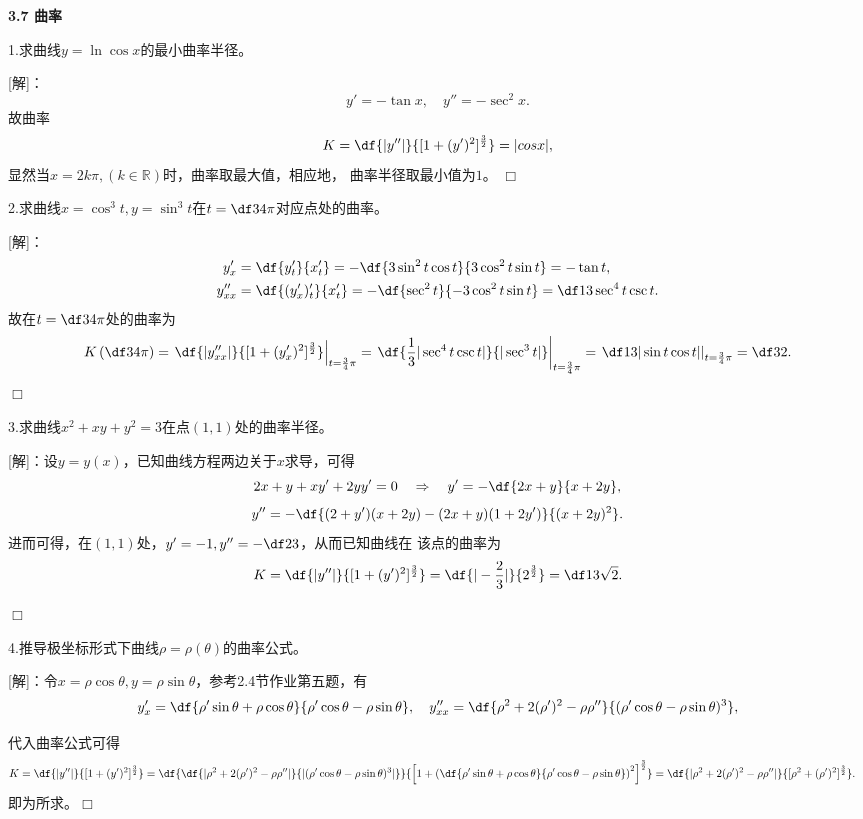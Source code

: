 \begin{center}
	\bf 3.7 曲率
\end{center}

1.求曲线$y=\ln\cos x$的最小曲率半径。

[解]：
$$y'=-\tan x,\quad y''=-\sec^2x.$$
故曲率
$$K=\df{|y''|}{[1+(y')^2]^{\frac32}}=|cos x|,$$
显然当$x=2k\pi,(k\in\mathbb{R})$时，曲率取最大值，相应地，
曲率半径取最小值为$1$。
\hfill$\Box$

\bigskip

2.求曲线$x=\cos^3t,y=\sin^3t$在$t=\df34\pi$对应点处的曲率。

[解]：
\begin{align*}
	y'_x&=\df{y'_t}{x'_t}=-\df{3\sin^2t\cos t}{3\cos^2t\sin t}
	=-\tan t,\\
	y''_{xx}&=\df{(y'_x)'_t}{x'_t}
	=-\df{\sec^2t}{-3\cos^2t\sin t}=\df13\sec^4t\csc t.
\end{align*}
故在$t=\df34\pi$处的曲率为
$$K\left(\df34\pi\right)=\left.\df{|y''_{xx}|}{[1+(y'_x)^2]^{\frac32}}\right|_{t=\frac34\pi}
=\left.\df{\frac13|\sec^4t\csc t|}{|\sec^3t|}\right|_{t=\frac34\pi}
=\left.\df1{3|\sin t\cos t|}\right|_{t=\frac34\pi}
=\df32.$$
\hfill$\Box$

\bigskip

3.求曲线$x^2+xy+y^2=3$在点$(1,1)$处的曲率半径。

[解]：设$y=y(x)$，已知曲线方程两边关于$x$求导，可得
$$2x+y+xy'+2yy'=0
\quad\Rightarrow\quad
y'=-\df{2x+y}{x+2y},$$
$$y''=-\df{(2+y')(x+2y)-(2x+y)(1+2y')}{(x+2y)^2}.$$
进而可得，在$(1,1)$处，$y'=-1,y''=-\df23$，从而已知曲线在
该点的曲率为
$$K=\df{|y''|}{[1+(y')^2]^{\frac32}}=\df{|-\frac23|}{2^{\frac32}}
=\df1{3\sqrt2}.$$

\hfill$\Box$

\bigskip

4.推导极坐标形式下曲线$\rho=\rho(\theta)$的曲率公式。

[解]：令$x=\rho\cos\theta,y=\rho\sin\theta$，参考2.4节作业第五题，有
$$
	y'_x=\df{\rho'\sin\theta+\rho\cos\theta}
	{\rho'\cos\theta-\rho\sin\theta},
	\quad
	y''_{xx}=\df{\rho^2+2(\rho')^2-\rho\rho''}
	{(\rho'\cos\theta-\rho\sin\theta)^3},
$$

代入曲率公式可得
\begin{align*}
	K&=\df{|y''|}{[1+(y')^2]^{\frac32}}
	=\df{\df{|\rho^2+2(\rho')^2-\rho\rho''|}
	{|(\rho'\cos\theta-\rho\sin\theta)^3|}}
	{\left[1+\left(\df{\rho'\sin\theta+\rho\cos\theta}
	{\rho'\cos\theta-\rho\sin\theta}
	\right)^2\right]^{\frac32}}
	=\df{|\rho^2+2(\rho')^2-\rho\rho''|}
	{[\rho^2+(\rho')^2]^{\frac32}}.
\end{align*}
即为所求。\hfill$\Box$

